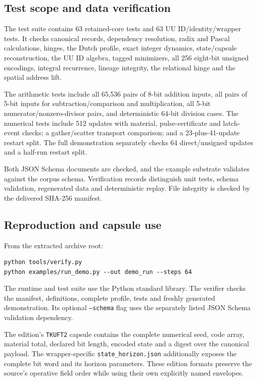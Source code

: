 \documentclass[11pt,a4paper]{article}
\numberwithin{equation}{section}
\begin{document}
\subsection{Test scope and data verification}
The test suite contains 63 retained-core tests and 63 UU ID/identity/wrapper tests. It checks canonical records, dependency resolution, radix and Pascal calculations, hinges, the Dutch profile, exact integer dynamics, state/capsule reconstruction, the UU ID algebra, tagged minimizers, all 256 eight-bit unsigned encodings, integral recurrence, lineage integrity, the relational hinge and the spatial address lift.

The arithmetic tests include all 65,536 pairs of 8-bit addition inputs, all pairs of 5-bit inputs for subtraction/comparison and multiplication, all 5-bit numerator/nonzero-divisor pairs, and deterministic 64-bit division cases. The numerical tests include 512 updates with material, pulse-certificate and latch-event checks; a gather/scatter transport comparison; and a 23-plus-41-update restart split. The full demonstration separately checks 64 direct/unsigned updates and a half-run restart split.

Both JSON Schema documents are checked, and the example substrate validates against the corpus schema. Verification records distinguish unit tests, schema validation, regenerated data and deterministic replay. File integrity is checked by the delivered SHA-256 manifest.

\subsection{Reproduction and capsule use}
From the extracted archive root:
\begin{lstlisting}
python tools/verify.py
python examples/run_demo.py --out demo_run --steps 64
\end{lstlisting}
The runtime and test suite use the Python standard library. The verifier checks the manifest, definitions, complete profile, tests and freshly generated demonstration. Its optional \texttt{--schema} flag uses the separately listed JSON Schema validation dependency.

The edition's \texttt{TKUFT2} capsule contains the complete numerical seed, code array, material total, declared bit length, encoded state and a digest over the canonical payload. The wrapper-specific \texttt{state\_horizon.json} additionally exposes the complete bit word and its horizon parameters. These edition formats preserve the source's operative field order while using their own explicitly named envelopes.
\end{document}
